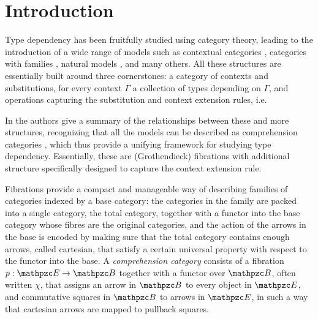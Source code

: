 \documentclass{lmcs} %
\theoremstyle{plain}\newtheorem{satz}[thm]{Satz} %
\begin{document}
\maketitle

\section{Introduction}\label{S:one}

Type dependency has been fruitfully studied using category theory, leading to the introduction of a wide range of models such as
contextual categories \cite{cartmell1986generalised}, categories with families \cite{dybjer1995internal}, natural models \cite{awodey2018natural}, and many others. 
All these structures are essentially built around three  cornerstones: 
a category of contexts and substitutions, 
for every context $\Gamma$ a collection of types depending on $\Gamma$, and 
operations capturing the substitution and context extension rules, i.e. 

In \cite{ahrens2024comparing} the authors give a summary of the relationships between these and more structures,
recognizing that all the models can be described as comprehension categories \cite{JACOBS1993169}, 
which thus provide a unifying framework for studying type dependency. 
Essentially, these are (Grothendieck) fibrations with additional structure specifically designed to capture the context extension rule. 

Fibrations provide a compact and manageable way of describing families of categories indexed by a base category: 
the categories in the family are packed into a single category, the total category, together with a functor into the base category whose fibres are the original categories,
and the action of the arrows in the base is encoded by making sure that the total category contains enough arrows, called cartesian, that satisfy a certain universal property with respect to the functor into the base.
A \emph{comprehension category} consists of a fibration $p: \ct{E}\to \ct{B}$ together with a functor over $\ct{B}$, often written $\chi$, that assigns an arrow in $\ct{B}$ to every object in $\ct{E}$, and commutative squares in $\ct{B}$ to arrows in $\ct{E}$, in such a way that cartesian arrows are mapped to pullback squares.
\end{document}
